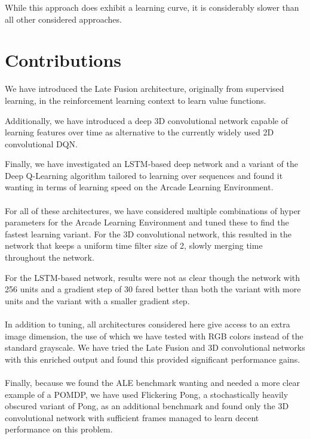 While this approach does exhibit a learning curve,
it is considerably slower than all other considered approaches.

\section{Contributions}
\label{sec:contributions}
We have introduced the Late Fusion architecture,
originally from supervised learning,
in the reinforcement learning context
to learn value functions.

Additionally,
we have introduced a deep 3D convolutional network
capable of learning features over time
as alternative to the currently widely used 2D convolutional DQN.

Finally,
we have investigated an LSTM-based deep network
and a variant of the Deep Q-Learning algorithm
tailored to learning over sequences
and found it wanting in terms of learning speed
on the Arcade Learning Environment.

\paragraph{}
For all of these architectures,
we have considered multiple combinations of hyper parameters
for the Arcade Learning Environment
and tuned these to find the fastest learning variant.
For the 3D convolutional network,
this resulted in the network
that keeps a uniform time filter size of 2,
slowly merging time throughout the network.

For the LSTM-based network,
results were not as clear
though the network with 256 units and a gradient step of 30
fared better than both the variant with more units
and the variant with a smaller gradient step.

\paragraph{}
In addition to tuning,
all architectures considered here
give access to an extra image dimension,
the use of which we have tested with RGB colors
instead of the standard grayscale.
We have tried the Late Fusion
and 3D convolutional networks with this enriched output
and found this provided significant performance gains.

\paragraph{}
Finally,
because we found the ALE benchmark wanting
and needed a more clear example of a POMDP,
we have used Flickering Pong,
a stochastically heavily obscured variant of Pong,
as an additional benchmark
and found only
the 3D convolutional network
with sufficient frames
managed to learn decent performance
on this problem.

